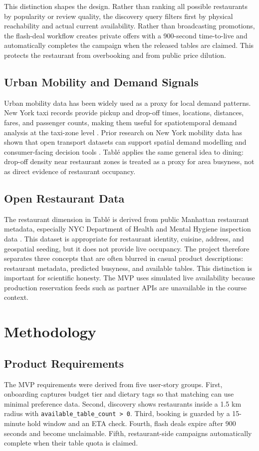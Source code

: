 \documentclass[conference]{IEEEtran}
\begin{document}
This distinction shapes the design. Rather than ranking all possible restaurants by popularity or review quality, the discovery query filters first by physical reachability and actual current availability. Rather than broadcasting promotions, the flash-deal workflow creates private offers with a 900-second time-to-live and automatically completes the campaign when the released tables are claimed. This protects the restaurant from overbooking and from public price dilution.

\subsection{Urban Mobility and Demand Signals}
Urban mobility data has been widely used as a proxy for local demand patterns. New York taxi records provide pickup and drop-off times, locations, distances, fares, and passenger counts, making them useful for spatiotemporal demand analysis at the taxi-zone level \cite{nyc_tlc_trip_data}. Prior research on New York mobility data has shown that open transport datasets can support spatial demand modelling and consumer-facing decision tools \cite{toman2020spatiotemporal,noulas2015openstreetcab}. Tabl\'e applies the same general idea to dining: drop-off density near restaurant zones is treated as a proxy for area busyness, not as direct evidence of restaurant occupancy.

\subsection{Open Restaurant Data}
The restaurant dimension in Tabl\'e is derived from public Manhattan restaurant metadata, especially NYC Department of Health and Mental Hygiene inspection data \cite{nyc_restaurant_inspections}. This dataset is appropriate for restaurant identity, cuisine, address, and geospatial seeding, but it does not provide live occupancy. The project therefore separates three concepts that are often blurred in casual product descriptions: restaurant metadata, predicted busyness, and available tables. This distinction is important for scientific honesty. The MVP uses simulated live availability because production reservation feeds such as partner APIs are unavailable in the course context.

\section{Methodology}
\subsection{Product Requirements}
The MVP requirements were derived from five user-story groups. First, onboarding captures budget tier and dietary tags so that matching can use minimal preference data. Second, discovery shows restaurants inside a 1.5 km radius with \texttt{available\_table\_count > 0}. Third, booking is guarded by a 15-minute hold window and an ETA check. Fourth, flash deals expire after 900 seconds and become unclaimable. Fifth, restaurant-side campaigns automatically complete when their table quota is claimed.
\end{document}
